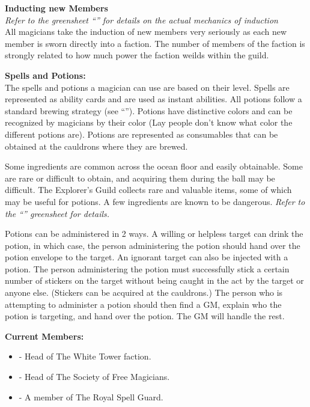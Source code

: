 \documentclass[blue]{NeptuneBall}
\begin{document}
{\bf Inducting new Members}\\
\emph{Refer to the greensheet ``\gInduction{}'' for details on the actual mechanics of induction} \\
All magicians take the induction of new members very seriously as each new member is sworn directly into a faction. The number of members of the faction is strongly related to how much power the faction weilds within the guild.

{\bf Spells and Potions:}\\
The spells and potions a magician can use are based on their level. Spells are represented as ability cards and are used as instant abilities. All potions follow a standard brewing strategy (see ``\gPotions{}''). Potions have distinctive colors and can be recognized by magicians by their color (Lay people don't know what color the different potions are). Potions are represented as consumables that can be obtained at the cauldrons where they are brewed.

Some ingredients are common across the ocean floor and easily obtainable. Some are rare or difficult to obtain, and acquiring them during the ball may be difficult. The Explorer's Guild collects rare and valuable items, some of which may be useful for potions. A few ingredients are known to be dangerous. \emph {Refer to the ``\gPotions{}'' greensheet for details.}

Potions can be administered in 2 ways. A willing or helpless target can drink the potion, in which case, the person administering the potion should hand over the potion envelope to the target. An ignorant target can also be injected with a potion. The person administering the potion must successfully stick a certain number of stickers on the target without being caught in the act by the target or anyone else. (Stickers can be acquired at the cauldrons.) The person who is attempting to administer a potion should then find a GM, explain who the potion is targeting, and hand over the potion. The GM will handle the rest.

{\bf Current Members:}
\begin{itemize}
\item \cManta{} - Head of The White Tower faction.
\item \cWitch{\MYname} - Head of The Society of Free Magicians.
\item \cBodyguard{} - A member of The Royal Spell Guard.
\end{itemize}
\end{document}
